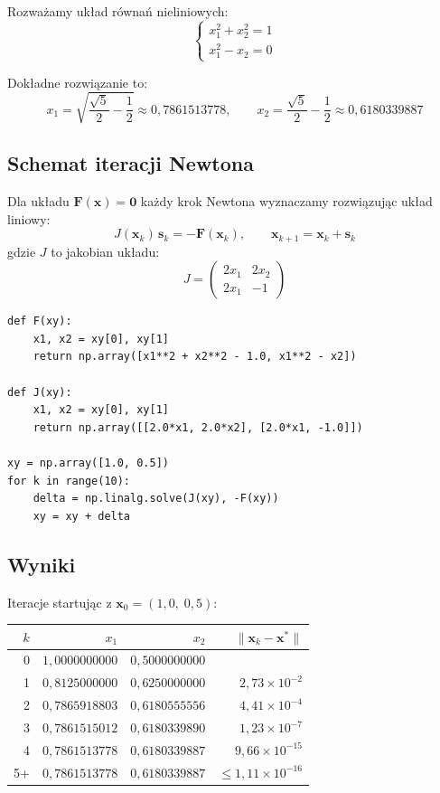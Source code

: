 \documentclass[12pt, a4paper]{article}
\begin{document}
Rozważamy układ równań nieliniowych:
\[
  \begin{cases}
    x_1^2 + x_2^2 = 1 \\
    x_1^2 - x_2 = 0
  \end{cases}
\]

Dokładne rozwiązanie to:
\[
  x_1 = \sqrt{\frac{\sqrt{5}}{2} - \frac{1}{2}} \approx 0{,}7861513778, \qquad
  x_2 = \frac{\sqrt{5}}{2} - \frac{1}{2} \approx 0{,}6180339887
\]

\subsection{Schemat iteracji Newtona}

Dla układu $\mathbf{F}(\mathbf{x}) = \mathbf{0}$ każdy krok Newtona wyznaczamy rozwiązując układ liniowy:
\[
  J(\mathbf{x}_k)\, \mathbf{s}_{k} = -\mathbf{F}(\mathbf{x}_k), \qquad \mathbf{x}_{k+1} = \mathbf{x}_k + \mathbf{s}_{k}
\]
gdzie $J$ to jakobian układu:
\[
  J = \begin{pmatrix} 2x_1 & 2x_2 \\ 2x_1 & -1 \end{pmatrix}
\]

\begin{lstlisting}[caption={Implementacja metody Newtona dla układu równań}]
def F(xy):
    x1, x2 = xy[0], xy[1]
    return np.array([x1**2 + x2**2 - 1.0, x1**2 - x2])

def J(xy):
    x1, x2 = xy[0], xy[1]
    return np.array([[2.0*x1, 2.0*x2], [2.0*x1, -1.0]])

xy = np.array([1.0, 0.5])
for k in range(10):
    delta = np.linalg.solve(J(xy), -F(xy))
    xy = xy + delta
\end{lstlisting}

\subsection{Wyniki}

Iteracje startując z $\mathbf{x}_0 = (1{,}0,\; 0{,}5)$:

\begin{center}
\begin{tabular}{r|r|r|r}
\toprule
$k$ & $x_1$ & $x_2$ & $\|\mathbf{x}_k - \mathbf{x}^*\|$ \\
\midrule
0 & $1{,}0000000000$ & $0{,}5000000000$ & \textendash{} \\
1 & $0{,}8125000000$ & $0{,}6250000000$ & $2{,}73 \times 10^{-2}$ \\
2 & $0{,}7865918803$ & $0{,}6180555556$ & $4{,}41 \times 10^{-4}$ \\
3 & $0{,}7861515012$ & $0{,}6180339890$ & $1{,}23 \times 10^{-7}$ \\
4 & $0{,}7861513778$ & $0{,}6180339887$ & $9{,}66 \times 10^{-15}$ \\
5+ & $0{,}7861513778$ & $0{,}6180339887$ & $\leq 1{,}11 \times 10^{-16}$ \\
\bottomrule
\end{tabular}
\end{center}
\end{document}
